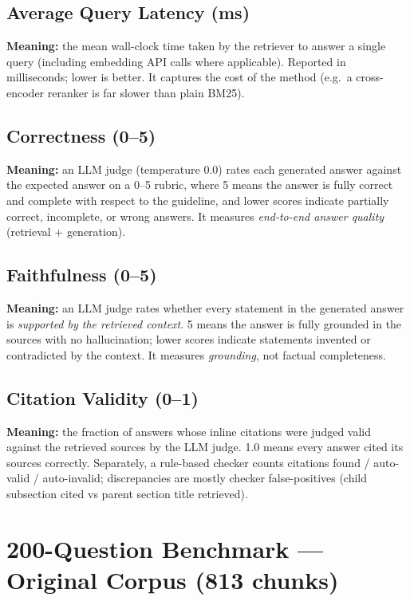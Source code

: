 \documentclass[11pt,a4paper]{article}
\begin{document}
\subsection{Average Query Latency (ms)}

\textbf{Meaning:} the mean wall-clock time taken by the retriever to answer a single query
(including embedding API calls where applicable). Reported in milliseconds; lower is
better. It captures the cost of the method (e.g.\ a cross-encoder reranker is far slower
than plain BM25).

\subsection{Correctness (0--5)}

\textbf{Meaning:} an LLM judge (temperature 0.0) rates each generated answer against the
expected answer on a 0--5 rubric, where 5 means the answer is fully correct and complete
with respect to the guideline, and lower scores indicate partially correct, incomplete,
or wrong answers. It measures \emph{end-to-end answer quality} (retrieval + generation).

\subsection{Faithfulness (0--5)}

\textbf{Meaning:} an LLM judge rates whether every statement in the generated answer is
\emph{supported by the retrieved context}. 5 means the answer is fully grounded in the
sources with no hallucination; lower scores indicate statements invented or contradicted
by the context. It measures \emph{grounding}, not factual completeness.

\subsection{Citation Validity (0--1)}

\textbf{Meaning:} the fraction of answers whose inline citations were judged valid
against the retrieved sources by the LLM judge. 1.0 means every answer cited its sources
correctly. Separately, a rule-based checker counts citations found / auto-valid /
auto-invalid; discrepancies are mostly checker false-positives (child subsection cited
vs parent section title retrieved).

\section{200-Question Benchmark --- Original Corpus (813 chunks)}
\end{document}
